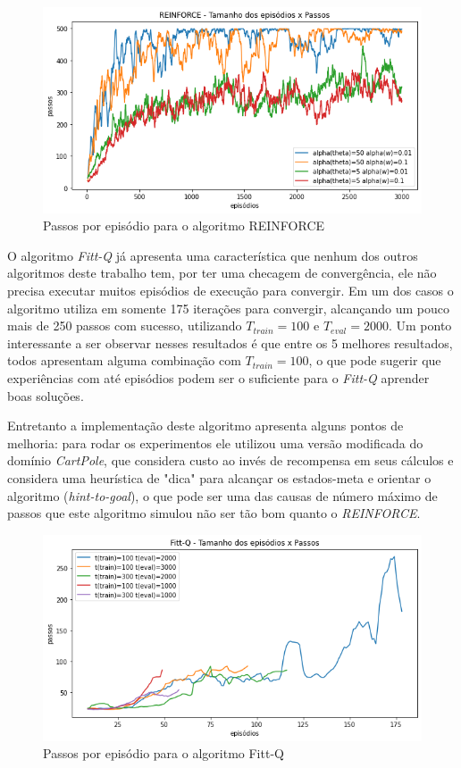 \documentclass[letterpaper]{article}
\begin{document}
\begin{figure}[t]
  \centering
  \includegraphics[width=0.9\columnwidth]{exp-reinforce-episodes}
  \caption{Passos por episódio para o algoritmo REINFORCE}
  \label{fig:exp-reinforce-episodes}
\end{figure}

O algoritmo \textit{Fitt-Q} já apresenta uma característica que nenhum dos outros algoritmos deste trabalho tem, por ter uma checagem de convergência, ele não precisa executar muitos episódios de execução para convergir. Em um dos casos o algoritmo utiliza em somente 175 iterações para convergir, alcançando um pouco mais de 250 passos com sucesso, utilizando $T_{train} = 100$ e $T_{eval} = 2000$. Um ponto interessante a ser observar nesses resultados é que entre os 5 melhores resultados, todos apresentam alguma combinação com $T_{train} = 100$, o que pode sugerir que experiências com até episódios podem ser o suficiente para o \textit{Fitt-Q} aprender boas soluções.

Entretanto a implementação deste algoritmo apresenta alguns pontos de melhoria: para rodar os experimentos ele utilizou uma versão modificada do domínio \textit{CartPole}, que considera custo ao invés de recompensa em seus cálculos e considera uma heurística de "dica" para alcançar os estados-meta e orientar o algoritmo (\textit{hint-to-goal}), o que pode ser uma das causas de número máximo de passos que este algoritmo simulou não ser tão bom quanto o \textit{REINFORCE}. 

\begin{figure}[t]
  \centering
  \includegraphics[width=0.9\columnwidth]{exp-fittq-episodes}
  \caption{Passos por episódio para o algoritmo Fitt-Q}
  \label{fig:exp-fittq-episodes}
\end{figure}
\end{document}
